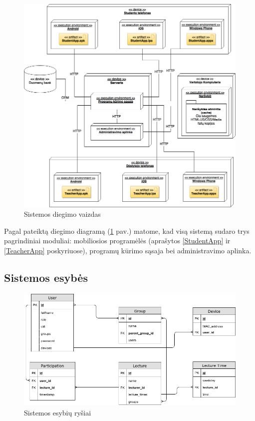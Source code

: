 \documentclass{VUMIFPSbakalaurinis}
\begin{document}
\begin{figure}[H]
	\centering
	\includegraphics[scale=0.5]{img/kursinio_deployment.png}
	\caption{Sistemos diegimo vaizdas}
	\label{img:deployment}
\end{figure}

Pagal pateiktą diegimo diagramą (\ref{img:deployment} pav.) matome, kad visą sistemą sudaro trys pagrindiniai moduliai: mobiliosios programėlės (aprašytos \ref{StudentApp} ir \ref{TeacherApp} poskyriuose), programų kūrimo sąsaja bei administravimo aplinka.

\subsection{Sistemos esybės}

\begin{figure}[H]
	\centering
	\includegraphics[scale=0.5]{img/Bakalauro-ER.png}
	\caption{Sistemos esybių ryšiai}
	\label{img:er-diagram}
\end{figure}
\end{document}
